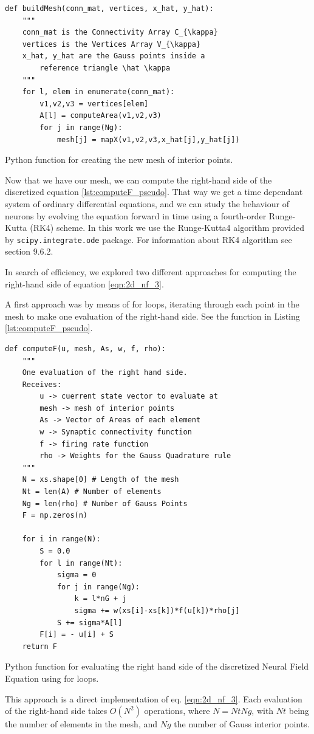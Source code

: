 \documentclass{uonmathreport}
\begin{document}
\begin{listing}[H]
	\begin{center}
		\begin{verbatim}
def buildMesh(conn_mat, vertices, x_hat, y_hat):
	"""
	conn_mat is the Connectivity Array C_{\kappa}
	vertices is the Vertices Array V_{\kappa}
	x_hat, y_hat are the Gauss points inside a 
		reference triangle \hat \kappa
	"""
	for l, elem in enumerate(conn_mat):
		v1,v2,v3 = vertices[elem]
		A[l] = computeArea(v1,v2,v3)
		for j in range(Ng):
			mesh[j] = mapX(v1,v2,v3,x_hat[j],y_hat[j])
		\end{verbatim}	
	\end{center}
	\caption{Python function for creating the new mesh of interior points.}
	\label{fig:buildMesh_pseudo}
\end{listing}
Now that we have our mesh, we can compute the right-hand side of the discretized equation \ref{lst:computeF_pseudo}. That way we get a time dependant system of ordinary differential equations, and we can study the behaviour of neurons by evolving the equation forward in time using a fourth-order Runge-Kutta (RK4) scheme. In this work we use the Runge-Kutta4 algorithm provided by \texttt{scipy.integrate.ode} package. For information about RK4 algorithm see \cite{heath2002scientific} section 9.6.2.

In search of efficiency, we explored two different approaches for computing the right-hand side of equation \ref{eqn:2d_nf_3}.

A first approach was by means of for loops, iterating through each point in the mesh to make one evaluation of the right-hand side. See the function in Listing \ref{lst:computeF_pseudo}.

\begin{listing}[H]
		\begin{verbatim}
def computeF(u, mesh, As, w, f, rho):
	"""
	One evaluation of the right hand side.
	Receives:
		u -> cuerrent state vector to evaluate at
		mesh -> mesh of interior points
		As -> Vector of Areas of each element
		w -> Synaptic connectivity function
		f -> firing rate function
		rho -> Weights for the Gauss Quadrature rule
	"""
	N = xs.shape[0] # Length of the mesh
	Nt = len(A) # Number of elements
	Ng = len(rho) # Number of Gauss Points
	F = np.zeros(n)
	
	for i in range(N):
		S = 0.0
		for l in range(Nt):
			sigma = 0
			for j in range(Ng):
				k = l*nG + j
				sigma += w(xs[i]-xs[k])*f(u[k])*rho[j]
			S += sigma*A[l]
		F[i] = - u[i] + S
	return F
		\end{verbatim}	
	\caption{Python function for evaluating the right hand side of the discretized Neural Field Equation using for loops.}
	\label{lst:computeF_pseudo}
\end{listing}
This approach is a direct implementation of eq. \ref{eqn:2d_nf_3}. Each evaluation of the right-hand side takes $O(N^2)$ operations, where $N=NtNg$, with $Nt$ being the number of elements in the mesh, and $Ng$ the number of Gauss interior points.
\end{document}
